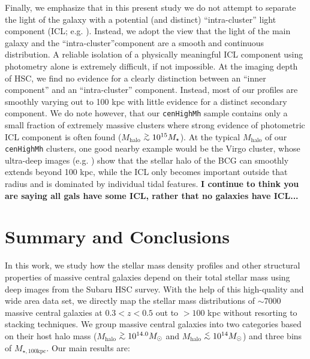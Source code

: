 \documentclass[a4paper,fleqn,usenatbib]{mnras}
\def\simlt{\lower.5ex\hbox{$\; \buildrel < \over {\sim} \;$}}
\def\simgt{\lower.5ex\hbox{$\; \buildrel > \over {\sim} \;$}}
\def\rbcg{\texttt{cenHighMh}}
\def\mhalo{{$M_{\mathrm{halo}}$}}
\def\mtot{{$M_{\star,100\mathrm{kpc}}$}}
\begin{document}
    Finally, we emphasize that in this present study we do not attempt to separate the 
    light of the galaxy with a potential (and distinct) ``intra-cluster''
    light component (ICL; e.g. \citealt{Carlberg1997, Lin2004, Gonzalez2005, 
    Mihos2005}). 
    Instead, we adopt the view that the light of the main galaxy and the 
    ``intra-cluster''component are a smooth and continuous distribution. 
    A reliable isolation of a physically meaningful ICL component using photometry 
    alone is extremely difficult, if not impossible. 
    At the imaging depth of HSC, we find no evidence for a clearly distinction between 
    an ``inner component'' and an ``intra-cluster'' component. 
    Instead, most of our profiles are smoothly varying out to 100 kpc with little 
    evidence for a distinct secondary component. 
    We do note however, that our \rbcg{} sample contains only a small fraction of 
    extremely massive clusters where strong evidence of photometric ICL component is 
    often found (\mhalo{}$\simgt 10^{15}M_{\star}$). 
    At the typical \mhalo{} of our \rbcg{} clusters, one good nearby example would be 
    the Virgo cluster, whose ultra-deep images (e.g. \citealt{Mihos2016}) show
    that the stellar halo of the BCG can smoothly extends beyond 100 kpc, while the 
    ICL only becomes important outside that radius and is dominated by individual 
    tidal features. {\bf I continue to think you are saying all gals have some ICL, rather 
    that no galaxies have ICL...}


\section{Summary and Conclusions}
    \label{sec:summary}
    
    In this work, we study how the stellar mass density profiles and other structural
    properties of massive central galaxies depend on their total stellar mass using 
    deep images from the Subaru HSC survey. 
    With the help of this high-quality and wide area data set, we directly map the 
    stellar mass distributions of ${\sim}7000$ massive central galaxies at 
    $0.3 < z < 0.5$ out to $>100$ kpc without resorting to stacking techniques. 
    We group massive central galaxies into two categories based on their host halo 
    mass (\mhalo{}$\simgt 10^{14.0} M_{\odot}$ and \mhalo{}$\simlt 10^{14} M_{\odot}$)
    and three bins of \mtot{}.  
    Our main results are:  
    
\end{document}
